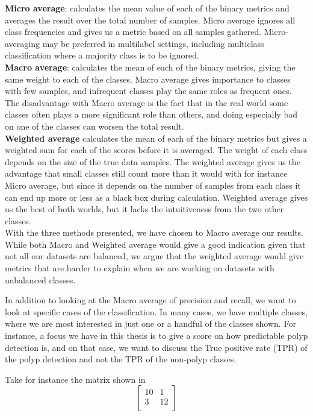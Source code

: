 \textbf{Micro average}: calculates the mean value of each of the binary metrics and averages the result over the total number of samples. 
Micro average ignores all class frequencies and gives us a metric based on all samples gathered. Micro-averaging may be preferred in multilabel settings, including multiclass classification where a majority class is to be ignored.\\

\textbf{Macro average}: calculates the mean of each of the binary metrics, giving the same weight to each of the classes. Macro average gives importance to classes with few samples, and infrequent classes play the same roles as frequent ones. The disadvantage with Macro average is the fact that in the real world some classes often plays a more significant role than others, and doing especially bad on one of the classes can worsen the total result. \\

\textbf{Weighted average} calculates the mean of each of the binary metrics but gives a weighted sum for each of the scores before it is averaged. 
The weight of each class depends on the size of the true data samples.
The weighted average gives us the advantage that small classes still count more than it would with for instance Micro average, but since it depends on the number of samples from each class it can end up more or less as a black box during calculation.
Weighted average gives us the best of both worlds, but it lacks the intuitiveness from the two other classes. \\

With the three methods presented, we have chosen to Macro average our results. While both Macro and Weighted average would give a good indication given that not all our datasets are balanced, we argue that the weighted average would give metrics that are harder to explain when we are working on datasets with unbalanced classes.

In addition to looking at the Macro average of precision and recall, we want to look at specific cases of the classification.  In many cases, we have multiple classes, where we are most interested in just one or a handful of the classes shown. 
For instance, a focus we have in this thesis is to give a score on how predictable polyp detection is, and on that case, we want to discuss the True positive rate (TPR) of the polyp detection and not the TPR of the non-polyp classes. 

Take for instance the matrix shown in \\
\[
\begin{bmatrix}
 10 & 1 \\
 3 & 12 \\
\end{bmatrix}
\]




